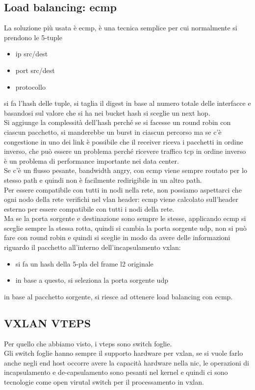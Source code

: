 \documentclass[12pt, oneside]{extbook} %
\begin{document}
\subsection{Load balancing: ecmp}
La soluzione più usata è ecmp, è una tecnica semplice per cui normalmente si prendono le 5-tuple
\begin{itemize}
    \item ip src/dest
    \item port src/dest
    \item protocollo
\end{itemize}
si fa l'hash delle tuple, si taglia il digest in base al numero totale delle interfacce e basandosi sul valore che si ha nei bucket hash si sceglie un next hop.
\\Si aggiunge la complessità dell'hash perché se si facesse un round robin con ciascun pacchetto, si manderebbe un burst in ciascun percorso ma se c'è congestione in uno dei link è possibile che il receiver riceva i pacchetti in ordine inverso, che può essere un problema perché ricevere traffico tcp in ordine inverso è un problema di performance importante nei data center.
\\Se c'è un flusso pesante, bandwidth angry, con ecmp viene sempre routato per lo stesso path e quindi non è facilmente redirigibile in un altro path.
\\Per essere compatibile con tutti in nodi nella rete, non possiamo aspettarci che ogni nodo della rete verifichi nel vlan header: ecmp viene calcolato sull'header esterno per essere compatibile con tutti i nodi della rete.
\\Ma se la porta sorgente e destinazione sono sempre le stesse, applicando ecmp si sceglie sempre la stessa rotta, quindi si cambia la porta sorgente udp, non si può fare con round robin e quindi si sceglie in modo da avere delle informazioni riguardo il pacchetto all'interno dell'incapsulamento vxlan:
\begin{itemize}
    \item si fa un hash della 5-pla del frame l2 originale
    \item in base a questo, si seleziona la porta sorgente udp
\end{itemize}
in base al pacchetto sorgente, si riesce ad ottenere load balancing con ecmp.

\subsection{VXLAN VTEPS}
Per quello che abbiamo visto, i vteps sono switch foglie.
\\Gli switch foglie hanno sempre il supporto hardware per vxlan, se si vuole farlo anche negli end host occorre avere la capacità hardware nella nic, le operazioni di incapsulamento e de-capsulamento sono pesanti nel kernel e quindi ci sono tecnologie come open virutal switch per il processamento in vxlan.
\end{document}
